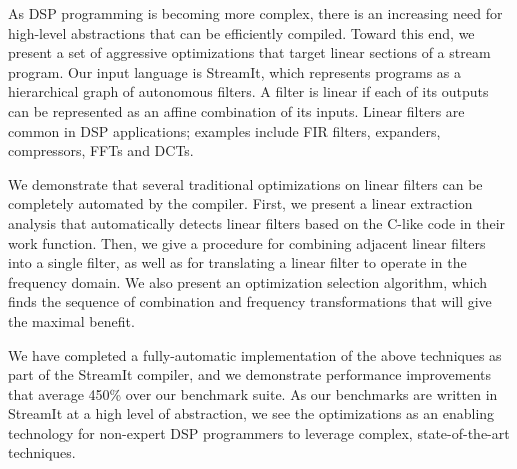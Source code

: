 As DSP programming is becoming more complex, there is an increasing
need for high-level abstractions that can be efficiently compiled.
Toward this end, we present a set of aggressive optimizations that
target linear sections of a stream program.  Our input language is
StreamIt, which represents programs as a hierarchical graph of
autonomous filters.  A filter is linear if each of its outputs can be
represented as an affine combination of its inputs.  Linear filters
are common in DSP applications; examples include FIR filters,
expanders, compressors, FFTs and DCTs.

We demonstrate that several traditional optimizations on linear
filters can be completely automated by the compiler.  First, we
present a linear extraction analysis that automatically detects linear
filters based on the C-like code in their work function.  Then, we
give a procedure for combining adjacent linear filters into a single
filter, as well as for translating a linear filter to operate in the
frequency domain.  We also present an optimization selection
algorithm, which finds the sequence of combination and frequency
transformations that will give the maximal benefit.

We have completed a fully-automatic implementation of the above
techniques as part of the StreamIt compiler, and we demonstrate
performance improvements that average 450\% over our benchmark suite.
As our benchmarks are written in StreamIt at a high level of
abstraction, we see the optimizations as an enabling technology for
non-expert DSP programmers to leverage complex, state-of-the-art
techniques.
